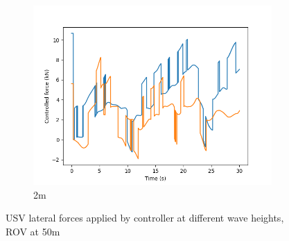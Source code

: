 \documentclass[class=article, crop=false]{standalone}
\begin{document}
\begin{figure}
\begin{subfigure}[b]{0.48\textwidth}
        \includegraphics{scenario1/rov-50m/2.0m/usv_forces}
        \caption{2m}
        \label{}
    \end{subfigure}

    \caption{USV lateral forces applied by controller at different wave heights, ROV at 50m}
\end{figure}
\end{document}
